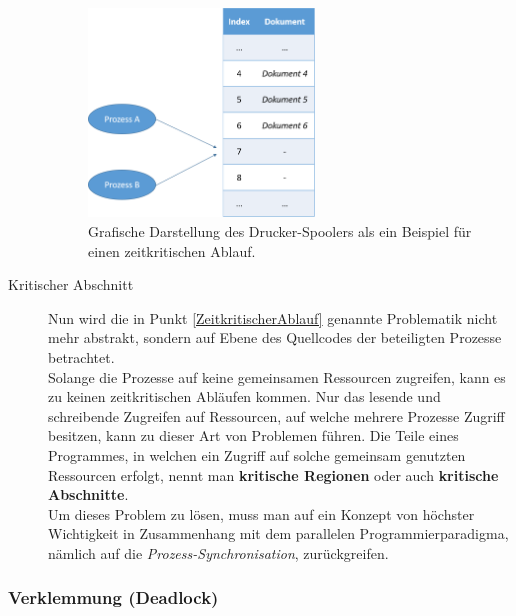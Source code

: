 \begin{description}
						\begin{figure}
							\centering	
							\includegraphics[width=6cm]{Abbildungen/Zeitkritischer_Ablauf_Drucker_Spooler.png}
							\caption{Grafische Darstellung des Drucker-Spoolers als ein Beispiel für einen zeitkritischen Ablauf.}
							\label{fig:ZeitkritischerAblaufDruckerSpooler}
						\end{figure}
					
					\item[Kritischer Abschnitt]

						Nun wird die in Punkt \ref{ZeitkritischerAblauf} genannte Problematik nicht mehr abstrakt, sondern auf Ebene des Quellcodes der beteiligten Prozesse betrachtet.\\
						Solange die Prozesse auf keine gemeinsamen Ressourcen zugreifen, kann es zu keinen zeitkritischen Abläufen kommen. Nur das lesende und schreibende Zugreifen auf Ressourcen, auf welche mehrere Prozesse Zugriff besitzen, kann zu dieser Art von Problemen führen. Die Teile eines Programmes, in welchen ein Zugriff auf solche gemeinsam genutzten Ressourcen erfolgt, nennt man \textbf{kritische Regionen} oder auch \textbf{kritische Abschnitte}.\\
						Um dieses Problem zu lösen, muss man auf ein Konzept von höchster Wichtigkeit in Zusammenhang mit dem parallelen Programmierparadigma, nämlich auf die \textit{Prozess-Synchronisation}, zurückgreifen.  \cite{ModerneBetriebssysteme}
				\end{description}
				
			\subsubsection{Verklemmung (Deadlock)}
			
